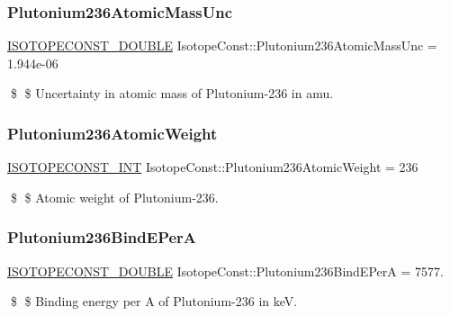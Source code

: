 \subsubsection{\texorpdfstring{Plutonium236\+Atomic\+Mass\+Unc}{Plutonium236AtomicMassUnc}}
{\footnotesize\ttfamily \mbox{\hyperlink{group___isotope_const-_macros_ga8f45a7272ce02c0b4c65c44636ed719a}{I\+S\+O\+T\+O\+P\+E\+C\+O\+N\+S\+T\+\_\+\+D\+O\+U\+B\+LE}} Isotope\+Const\+::\+Plutonium236\+Atomic\+Mass\+Unc = 1.\+944e-\/06}

\$ \$ Uncertainty in atomic mass of Plutonium-\/236 in amu. \mbox{\label{group___isotope_const-_plutonium-_pu236_ga3204494d1d8f628b6a8ce65a95d7260c}} 
\subsubsection{\texorpdfstring{Plutonium236\+Atomic\+Weight}{Plutonium236AtomicWeight}}
{\footnotesize\ttfamily \mbox{\hyperlink{group___isotope_const-_macros_ga5f18360b3e99483a35c32d789e62621c}{I\+S\+O\+T\+O\+P\+E\+C\+O\+N\+S\+T\+\_\+\+I\+NT}} Isotope\+Const\+::\+Plutonium236\+Atomic\+Weight = 236}

\$ \$ Atomic weight of Plutonium-\/236. \mbox{\label{group___isotope_const-_plutonium-_pu236_ga8c6ff369860814197b68503b9d7bb535}} 
\subsubsection{\texorpdfstring{Plutonium236\+Bind\+E\+PerA}{Plutonium236BindEPerA}}
{\footnotesize\ttfamily \mbox{\hyperlink{group___isotope_const-_macros_ga8f45a7272ce02c0b4c65c44636ed719a}{I\+S\+O\+T\+O\+P\+E\+C\+O\+N\+S\+T\+\_\+\+D\+O\+U\+B\+LE}} Isotope\+Const\+::\+Plutonium236\+Bind\+E\+PerA = 7577.}

\$ \$ Binding energy per A of Plutonium-\/236 in keV. \mbox{\label{group___isotope_const-_plutonium-_pu236_ga408133e6ed76b70b8509504eb2d8dae2}} 
